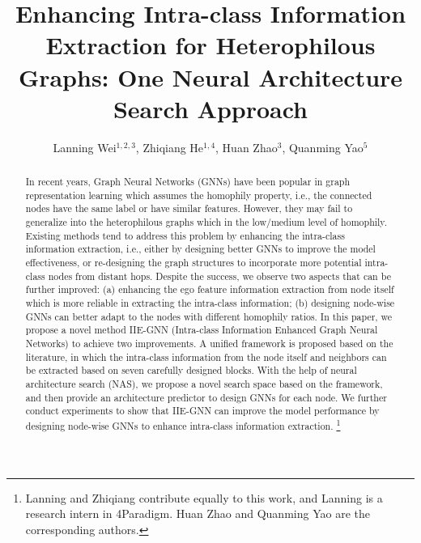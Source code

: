\documentclass[sigconf]{acmart}
\begin{document}
\title{Enhancing Intra-class Information Extraction for Heterophilous Graphs: One Neural Architecture Search Approach}


\author{Lanning Wei$^{1,2,3}$, 
		Zhiqiang He$^{1,4}$,
	Huan Zhao$^3$, 
	Quanming Yao$^{5}$}





\begin{abstract}
	In recent years, Graph Neural Networks (GNNs) have been popular in graph representation learning which assumes the homophily property, i.e., the connected nodes have the same label or have similar features. However, they may fail to generalize into the heterophilous graphs which in the low/medium level of homophily. 
	Existing methods tend to address this problem by enhancing the intra-class information extraction, i.e., either by designing better GNNs to improve the model effectiveness, or re-designing the graph structures to incorporate more potential intra-class nodes from distant hops. 
	Despite the success, we observe two aspects that can be further improved: (a) enhancing the ego feature information extraction from node itself which is more reliable in extracting the intra-class information; (b) designing node-wise GNNs can better adapt to the nodes with different homophily ratios.
	In this paper, we propose a novel method IIE-GNN (Intra-class Information Enhanced Graph Neural Networks) to achieve two improvements. A unified framework is proposed based on the literature, in which the intra-class information from the node itself and neighbors can be extracted based on seven carefully designed blocks. With the help of neural architecture search (NAS), we propose a novel search space based on the framework, and then provide an architecture predictor to design GNNs for each node.
	We further conduct experiments to show that IIE-GNN can improve the model performance by designing node-wise GNNs to enhance intra-class information extraction.
\footnote{Lanning and Zhiqiang contribute equally to this work, and Lanning is a research intern in 4Paradigm. Huan Zhao and Quanming Yao are the corresponding authors. }

\end{abstract}
\end{document}
